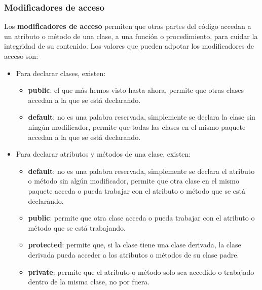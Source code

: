 \subsubsection{Modificadores de acceso}
\hspace{0.55cm}Los \textbf{modificadores de acceso} permiten que otras partes del código accedan a un atributo o método de una clase, a una función o procedimiento, para cuidar la integridad de su contenido. Los valores que pueden adpotar los modificadores de acceso son:
\begin{itemize}
    \item Para declarar clases, existen:
        \begin{itemize}
            \item \textbf{public}: el que más hemos visto hasta ahora, permite que otras clases accedan a la que se está declarando.
            \item \textbf{default}: no es una palabra reservada, simplemente se declara la clase sin ningún modificador, permite que todas las clases en el mismo paquete accedan a la que se está declarando.
        \end{itemize}
    \item Para declarar atributos y métodos de una clase, existen:
        \begin{itemize}
            \item \textbf{default}: no es una palabra reservada, simplemente se declara el atributo o método sin algún modificador, permite que otra clase en el mismo paquete acceda o pueda trabajar con el atributo o método que se está declarando.
            \item \textbf{public}: permite que otra clase acceda o pueda trabajar con el atributo o método que se está trabajando.
            \item \textbf{protected}: permite que, si la clase tiene una clase derivada, la clase derivada pueda acceder a los atributos o métodos de su clase padre.
            \item \textbf{private}: permite que el atributo o método solo sea accedido o trabajado dentro de la misma clase, no por fuera.
        \end{itemize}
\end{itemize}


